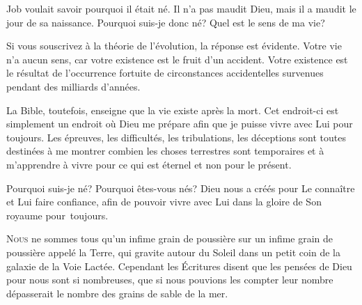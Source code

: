 
Job voulait savoir pourquoi il était né. Il n'a pas maudit Dieu,
 mais il a maudit le jour de sa naissance.
 \Og Pourquoi suis-je donc né? Quel est le sens de ma vie? \Fg{}

Si vous souscrivez à la théorie de l'évolution, la réponse est évidente.
 Votre vie n'a aucun sens, car votre existence est le fruit d'un accident.
 Votre existence est le résultat de l'occurrence fortuite
 de circonstances accidentelles survenues pendant des milliards d'années.

La Bible, toutefois, enseigne que la vie existe après la mort.
 Cet endroit-ci est simplement un endroit où Dieu me prépare
 afin que je puisse vivre avec Lui pour toujours.
 Les épreuves, les difficultés, les tribulations,
 les déceptions sont toutes destinées à me montrer
 combien les choses terrestres sont temporaires
 et à m'apprendre à vivre pour ce qui est éternel et non pour le présent.

Pourquoi suis-je né? Pourquoi êtes-vous nés?
 Dieu nous a créés pour Le connaître et Lui faire confiance,
 afin de pouvoir vivre avec Lui dans la gloire de Son royaume pour~toujours. 

\dvrule







\lettrine{N}{ous} ne sommes tous qu'un infime grain de poussière
 sur un infime grain de poussière appelé la Terre,
 qui gravite autour du Soleil dans un petit coin de la galaxie
 de la Voie Lactée.
 Cependant les Écritures disent que les pensées de Dieu pour nous
 sont si nombreuses, que si nous pouvions les compter
 leur nombre dépasserait le nombre des grains de sable de la mer.

